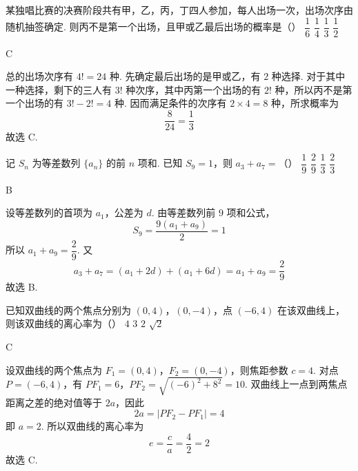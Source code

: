 \begin{problem}
某独唱比赛的决赛阶段共有甲，乙，丙，丁四人参加，每人出场一次，出场次序由随机抽签确定. 则丙不是第一个出场，且甲或乙最后出场的概率是（\quad）
\choices
    {\(\dfrac16\)}
    {\(\dfrac14\)}
    {\(\dfrac13\)}
    {\(\dfrac12\)}
\end{problem}

\begin{answer}
C
\end{answer}

\begin{solution}
总的出场次序有 \(4!=24\) 种. 先确定最后出场的是甲或乙，有 \(2\) 种选择. 对于其中一种选择，剩下的三人有 \(3!\) 种次序，其中丙第一个出场的有 \(2!\) 种，所以丙不是第一个出场的有 \(3!-2!=4\) 种. 因而满足条件的次序有 \(2\times4=8\) 种，所求概率为
\[
\frac{8}{24}=\frac13
\]
故选 C.
\end{solution}

\begin{problem}
记 \(S_n\) 为等差数列 \(\{a_n\}\) 的前 \(n\) 项和. 已知 \(S_9=1\)，则 \(a_3+a_7=\)（\quad）
\choices
    {\(\dfrac19\)}
    {\(\dfrac29\)}
    {\(\dfrac13\)}
    {\(\dfrac23\)}
\end{problem}

\begin{answer}
B
\end{answer}

\begin{solution}
设等差数列的首项为 \(a_1\)，公差为 \(d\). 由等差数列前 \(9\) 项和公式，
\[
S_9=\frac{9(a_1+a_9)}2=1
\]
所以 \(a_1+a_9=\dfrac29\). 又
\[
a_3+a_7=(a_1+2d)+(a_1+6d)=a_1+a_9=\frac29
\]
故选 B.
\end{solution}

\begin{problem}
已知双曲线的两个焦点分别为 \((0,4)\)，\((0,-4)\)，点 \((-6,4)\) 在该双曲线上，则该双曲线的离心率为（\quad）
\choices
    {\(4\)}
    {\(3\)}
    {\(2\)}
    {\(\sqrt2\)}
\end{problem}

\begin{answer}
C
\end{answer}

\begin{solution}
设双曲线的两个焦点为 \(F_1=(0,4)\)，\(F_2=(0,-4)\)，则焦距参数 \(c=4\). 对点 \(P=(-6,4)\)，有
\(PF_1=6\)，\(PF_2=\sqrt{(-6)^2+8^2}=10\).
双曲线上一点到两焦点距离之差的绝对值等于 \(2a\)，因此
\[
2a=|PF_2-PF_1|=4
\]
即 \(a=2\). 所以双曲线的离心率为
\[
e=\frac ca=\frac42=2
\]
故选 C.
\end{solution}

